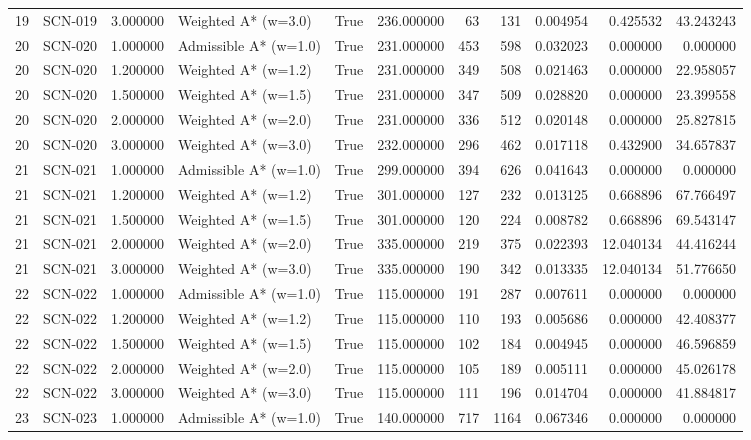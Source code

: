 \begin{table}[htbp]
\begin{tabular}{rlrlrrrrrrr}
19 & SCN-019 & 3.000000 & Weighted A* (w=3.0) & True & 236.000000 & 63 & 131 & 0.004954 & 0.425532 & 43.243243 \\
20 & SCN-020 & 1.000000 & Admissible A* (w=1.0) & True & 231.000000 & 453 & 598 & 0.032023 & 0.000000 & 0.000000 \\
20 & SCN-020 & 1.200000 & Weighted A* (w=1.2) & True & 231.000000 & 349 & 508 & 0.021463 & 0.000000 & 22.958057 \\
20 & SCN-020 & 1.500000 & Weighted A* (w=1.5) & True & 231.000000 & 347 & 509 & 0.028820 & 0.000000 & 23.399558 \\
20 & SCN-020 & 2.000000 & Weighted A* (w=2.0) & True & 231.000000 & 336 & 512 & 0.020148 & 0.000000 & 25.827815 \\
20 & SCN-020 & 3.000000 & Weighted A* (w=3.0) & True & 232.000000 & 296 & 462 & 0.017118 & 0.432900 & 34.657837 \\
21 & SCN-021 & 1.000000 & Admissible A* (w=1.0) & True & 299.000000 & 394 & 626 & 0.041643 & 0.000000 & 0.000000 \\
21 & SCN-021 & 1.200000 & Weighted A* (w=1.2) & True & 301.000000 & 127 & 232 & 0.013125 & 0.668896 & 67.766497 \\
21 & SCN-021 & 1.500000 & Weighted A* (w=1.5) & True & 301.000000 & 120 & 224 & 0.008782 & 0.668896 & 69.543147 \\
21 & SCN-021 & 2.000000 & Weighted A* (w=2.0) & True & 335.000000 & 219 & 375 & 0.022393 & 12.040134 & 44.416244 \\
21 & SCN-021 & 3.000000 & Weighted A* (w=3.0) & True & 335.000000 & 190 & 342 & 0.013335 & 12.040134 & 51.776650 \\
22 & SCN-022 & 1.000000 & Admissible A* (w=1.0) & True & 115.000000 & 191 & 287 & 0.007611 & 0.000000 & 0.000000 \\
22 & SCN-022 & 1.200000 & Weighted A* (w=1.2) & True & 115.000000 & 110 & 193 & 0.005686 & 0.000000 & 42.408377 \\
22 & SCN-022 & 1.500000 & Weighted A* (w=1.5) & True & 115.000000 & 102 & 184 & 0.004945 & 0.000000 & 46.596859 \\
22 & SCN-022 & 2.000000 & Weighted A* (w=2.0) & True & 115.000000 & 105 & 189 & 0.005111 & 0.000000 & 45.026178 \\
22 & SCN-022 & 3.000000 & Weighted A* (w=3.0) & True & 115.000000 & 111 & 196 & 0.014704 & 0.000000 & 41.884817 \\
23 & SCN-023 & 1.000000 & Admissible A* (w=1.0) & True & 140.000000 & 717 & 1164 & 0.067346 & 0.000000 & 0.000000 \\

\end{tabular}
\end{table}
